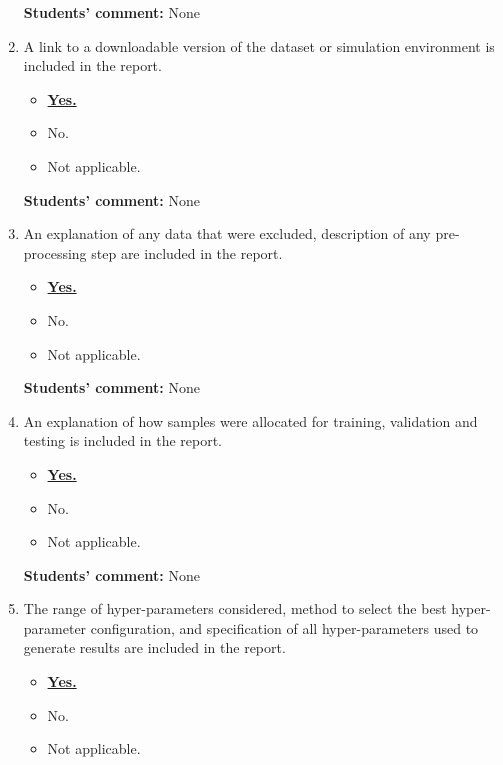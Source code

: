 \documentclass{article}
\begin{document}
\begin{enumerate}
    \textbf{Students' comment:} None
    
    \item A link to a downloadable version of the dataset or simulation environment is included in the report.
    \begin{itemize}
        \item [\faSquareO] \textbf{\underline{Yes.}}
        \item [\faSquareO] No.
        \item [\faSquareO] Not applicable.
    \end{itemize}
    
    \textbf{Students' comment:} None
    
    \item An explanation of any data that were excluded, description of any pre-processing step are included in the report.
    \begin{itemize}
        \item [\faSquareO] \textbf{\underline{Yes.}}
        \item [\faSquareO] No.
        \item [\faSquareO] Not applicable.
    \end{itemize}
    
    \textbf{Students' comment:} None
    
    \item An explanation of how samples were allocated for training, validation and testing is included in the report.
    \begin{itemize}
        \item [\faSquareO] \textbf{\underline{Yes.}}
        \item [\faSquareO] No.
        \item [\faSquareO] Not applicable.
    \end{itemize}
    
    \textbf{Students' comment:} None
    
    \item The range of hyper-parameters considered, method to select the best hyper-parameter
configuration, and specification of all hyper-parameters used to generate results are included in the report.
    \begin{itemize}
        \item [\faSquareO] \textbf{\underline{Yes.}}
        \item [\faSquareO] No.
        \item [\faSquareO] Not applicable.
    \end{itemize}
    

\end{enumerate}
\end{document}

